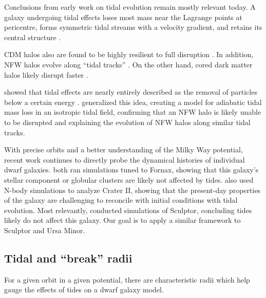 Conclusions from early work on tidal evolution remain mostly relevant
today. A galaxy undergoing tidal effects loses most mass near the
Lagrange points at pericentre, forms symmetric tidal streams with a
velocity gradient, and retains its central structure
\citep{oh+lin+aarseth1995, piatek+pryor1995, moore+davis1994, johnston+spergel+hernquist1995, read+2006}.

CDM halos also are found to be highly resilient to full disruption
\citep{EP2020}. In addition, NFW halos evolve along ``tidal tracks''
\citep[e.g,][]{PNM2008, green+vandenbosch2019, EN2021}. On the other
hand, cored dark matter halos likely disrupt faster
\citep[e.g.,][]{penarrubia+2010, errani+2023a}.

\citet{drakos+taylor+benson2020, drakos+taylor+benson2022, amorisco2021}
showed that tidal effects are nearly entirely described as the removal
of particles below a certain energy \citep[see
also][]{choi+weinberg+katz2009}. \citet{stucker+2023} generalized this
idea, creating a model for adiabatic tidal mass loss in an isotropic
tidal field, confirming that an NFW halo is likely unable to be
disrupted and explaining the evolution of NFW halos along similar tidal
tracks.

With precise orbits and a better understanding of the Milky Way
potential, recent work continues to directly probe the dynamical
histories of individual dwarf galaxies.
\citet{borukhovetskaya+2022, dicintio+2024} both ran simulations tuned
to Fornax, showing that this galaxy's stellar component or globular
clusters are likely not affected by tides. \citet{borukhovetskaya+2022a}
also used N-body simulations to analyze Crater II, showing that the
present-day properties of the galaxy are challenging to reconcile with
\LCDM{} initial conditions with tidal evolution. Most relevantly,
\citet{iorio+2019} conducted simulations of Sculptor, concluding tides
likely do not affect this galaxy. Our goal is to apply a similar
framework to Sculptor and Ursa Minor.

\subsection{Tidal and ``break'' radii}\label{sec:break_radii}

For a given orbit in a given potential, there are characteristic radii
which help gauge the effects of tides on a dwarf galaxy model.

